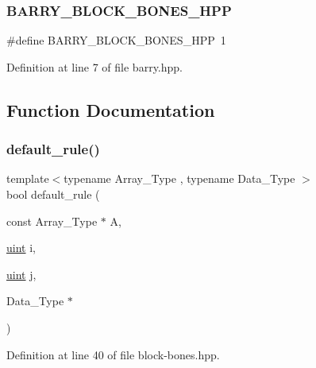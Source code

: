 \subsubsection{\texorpdfstring{B\+A\+R\+R\+Y\+\_\+\+B\+L\+O\+C\+K\+\_\+\+B\+O\+N\+E\+S\+\_\+\+H\+PP}{BARRY\_BLOCK\_BONES\_HPP}}
{\footnotesize\ttfamily \#define B\+A\+R\+R\+Y\+\_\+\+B\+L\+O\+C\+K\+\_\+\+B\+O\+N\+E\+S\+\_\+\+H\+PP~1}



Definition at line 7 of file barry.\+hpp.



\subsection{Function Documentation}
\mbox{\label{block-bones_8hpp_a4aff3c5c755b16bc4634ab8d8e7fb3f6}} 
\subsubsection{\texorpdfstring{default\+\_\+rule()}{default\_rule()}}
{\footnotesize\ttfamily template$<$typename Array\+\_\+\+Type , typename Data\+\_\+\+Type $>$ \\
bool default\+\_\+rule (\begin{DoxyParamCaption}\item[{const Array\+\_\+\+Type $\ast$}]{A,  }\item[{\hyperlink{typedefs_8hpp_a91ad9478d81a7aaf2593e8d9c3d06a14}{uint}}]{i,  }\item[{\hyperlink{typedefs_8hpp_a91ad9478d81a7aaf2593e8d9c3d06a14}{uint}}]{j,  }\item[{Data\+\_\+\+Type $\ast$}]{ }\end{DoxyParamCaption})\hspace{0.3cm}{\ttfamily [inline]}}



Definition at line 40 of file block-\/bones.\+hpp.

